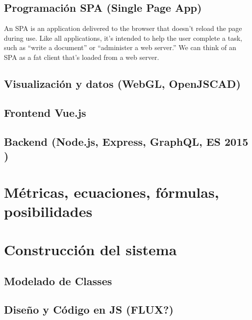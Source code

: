 \subsection{Programación SPA (Single Page App)}

\begin{displayquote}
An SPA is an application delivered to the browser that doesn’t reload the page during use. Like all applications, it’s intended to help the user complete a task, such as “write a document” or “administer a web server.” We can think of an SPA as a fat client that’s loaded from a web server. \cite{Mikowski2015}
\end{displayquote}



\subsection{Visualización y datos (WebGL, OpenJSCAD)}

\subsection{Frontend Vue.js}

\subsection{Backend (Node.js, Express, GraphQL, ES 2015 )}


\section{Métricas, ecuaciones, fórmulas, posibilidades}


\section{Construcción del sistema}

\subsection{Modelado de Classes}

\subsection{Diseño y Código en JS (FLUX?)}

